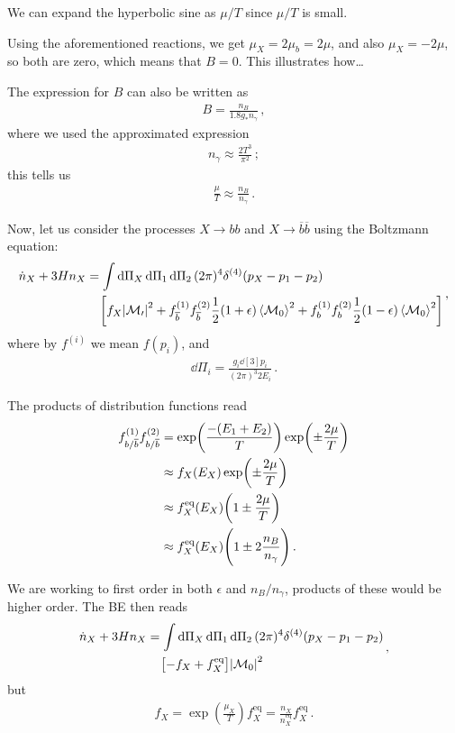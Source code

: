 \documentclass[main.tex]{subfiles}
\begin{document}
We can expand the hyperbolic sine as \(\mu / T\) since \(\mu / T\) is small. 

Using the aforementioned reactions, we get \(\mu _X = 2 \mu _b = 2 \mu \), and also \(\mu _X = - 2 \mu \), so both are zero, which means that \(B = 0\). 
This illustrates how\dots

The expression for \(B\) can also be written as 
%
\begin{align}
B = \frac{n_B}{\num{1.8} g_* n_\gamma } 
\,,
\end{align}
%
where we used the approximated expression 
%
\begin{align}
n_\gamma \approx \frac{2 T^3}{\pi^2}
\,;
\end{align}
%
this tells us 
%
\begin{align}
\frac{\mu}{T} \approx \frac{n_B}{n_\gamma }
\,.
\end{align}

Now, let us consider the processes \(X \to bb\) and \(X \to \overline{b} \overline{b}\) using the Boltzmann equation: 
%
\begin{align}
\begin{split}
\dot{n}_X + 3 H n_X &= 
\int \dd{\Pi_X } \dd{\Pi_1 } \dd{\Pi _2} (2 \pi )^{4} \delta^{(4)}(p_X - p_1 - p_2)\\
&\phantom{=}\ 
\qty[f_X \abs{\mathcal{M_0 }}^2 
+ f_{\overline{b}}^{(1)} f_{\overline{b}}^{(2)} \frac{1}{2} (1 + \epsilon ) \expval{\mathcal{M}_0}^2
+ f_{b}^{(1)} f_{b}^{(2)} \frac{1}{2} (1 - \epsilon ) \expval{\mathcal{M}_0}^2
]
\end{split}
\,,
\end{align}
%
where by \(f^{(i)}\) we mean \(f(p_i)\), and
%
\begin{align}
\dd{\Pi _i} = \frac{g_i \dd[3]{p_i}}{(2 \pi )^3 2 E_i}
\,.
\end{align}

The products 
of distribution functions read 
%
\begin{align}
f_{b/ \overline{b}}^{(1)} f_{b/ \overline{b}}^{(2)}  &= \exp(\frac{-(E_1 + E_2 )}{T}) \exp(\pm \frac{2 \mu }{T})  \\
&\approx f_X (E_X) \exp(\pm \frac{2 \mu }{T})  \\
&\approx f_X^{\text{eq}} (E_X) \qty(1 \pm \frac{2\mu}{T})  \\
&\approx f_X^{\text{eq}} (E_X) \qty(1 \pm 2 \frac{n_B}{n_\gamma })
\,.
\end{align}

We are working to first order in both \(\epsilon \) and \(n_B / n_\gamma \), products of these would be higher order. 
The BE then reads 
%
\begin{align}
\begin{split}
\dot{n}_X + 3 H n_X &= 
\int \dd{\Pi_X } \dd{\Pi_1 } \dd{\Pi _2} (2 \pi )^{4} \delta^{(4)}(p_X - p_1 - p_2)\\
&\phantom{=}\ 
\qty[- f_X + f_X^{\text{eq}}] \abs{\mathcal{M}_0}^2
\end{split}
\,,
\end{align}
%
but 
%
\begin{align}
f_X = \exp( \frac{\mu_X}{T}) f_X^{\text{eq}} = \frac{n_X}{n_X^{\text{eq}}} f_X^{\text{eq}}
\,.
\end{align}
\end{document}
